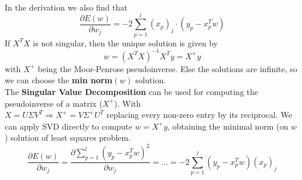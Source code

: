 \documentclass[10pt]{report}
\begin{document}
In the derivation we also find that $$\frac{\partial E(w)}{\partial w_j} = -2 \sum_{p=1}^l (x_p)_j \cdot (y_p - x_p^T w)$$
If $X^T X$ is not singular, then the unique solution is given by $$w = (X^T X)^{-1}X^T y = X^+ y$$ with $X^+$ being the Moor-Penrose pseudoinverse. Else the solutions are infinite, so we can choose the \textbf{min norm}$(w)$ solution.\\
The \textbf{Singular Value Decomposition} can be used for computing the pseudoinverse of a matrix ($X^+$). With\\ $X = U\Sigma V^T \Rightarrow X^+ = V\Sigma^+ U^T$ replacing every non-zero entry by its reciprocal. We can apply SVD directly to compute $w = X^+ y$, obtaining the minimal norm (on $w$) solution of least squares problem.
$$\frac{\partial E(w)}{\partial w_j} = \frac{\partial \sum_{p=1}^l (y_p - x_p^T w)^2}{\partial w_j} = \ldots = -2 \sum_{p=1}^l (y_p - x_p^T w)(x_p)_j$$
\end{document}
